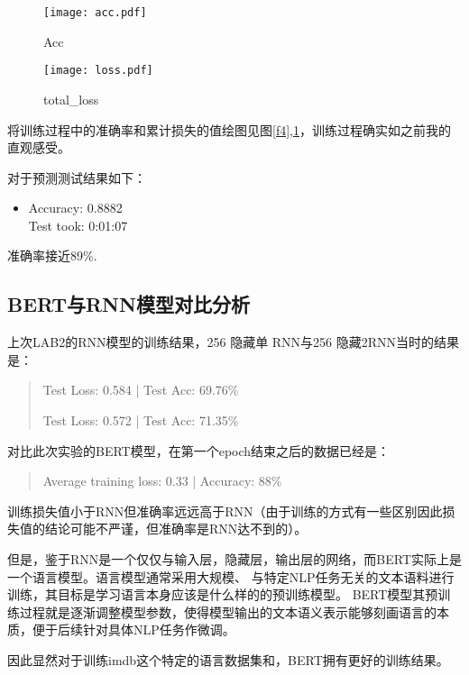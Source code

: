 \documentclass[a4paper,AutoFakeBold,AutoFakeSlant]{ctexart}
\begin{document}
\begin{figure}[htbp]
  \centering
  \begin{minipage}[t]{0.48\textwidth}
  \centering
  \texttt{[image: acc.pdf]}
  \caption{Acc}
  \label{f4}
  \end{minipage}
  \begin{minipage}[t]{0.48\textwidth}
  \centering
  \texttt{[image: loss.pdf]}
  \caption{total\_loss}
  \label{f5}
  \end{minipage}
\end{figure}
将训练过程中的准确率和累计损失的值绘图见图\ref{f4},\ref{f5}，训练过程确实如之前我的直观感受。

对于预测测试结果如下：
\begin{itemize}
  \item Accuracy: 0.8882\\
  Test took: 0:01:07
\end{itemize}
准确率接近89\%.

\subsection{BERT与RNN模型对比分析}
上次LAB2的RNN模型的训练结果，256 隐藏单 RNN与256 隐藏2RNN当时的结果是：
\begin{quotation}
  Test Loss: 0.584 | Test Acc: 69.76\%

  Test Loss: 0.572 | Test Acc: 71.35\%
\end{quotation}

对比此次实验的BERT模型，在第一个epoch结束之后的数据已经是：
\begin{quotation}
  Average training loss: 0.33 | Accuracy: 88\%
\end{quotation}
训练损失值小于RNN但准确率远远高于RNN（由于训练的方式有一些区别因此损失值的结论可能不严谨，但准确率是RNN达不到的）。

但是，鉴于RNN是一个仅仅与输入层，隐藏层，输出层的网络，而BERT实际上是一个语言模型。语言模型通常采用大规模、
与特定NLP任务无关的文本语料进行训练，其目标是学习语言本身应该是什么样的的预训练模型。
BERT模型其预训练过程就是逐渐调整模型参数，使得模型输出的文本语义表示能够刻画语言的本质，便于后续针对具体NLP任务作微调。

因此显然对于训练imdb这个特定的语言数据集和，BERT拥有更好的训练结果。

% 
% 
\end{document}
